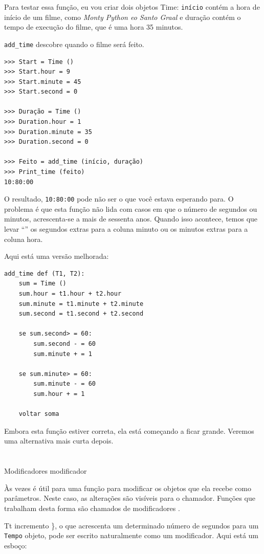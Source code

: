 \documentclass[10pt]{book}
\begin{document}
\begin{v erbatim}
Para testar essa função, eu vou criar dois objetos Time: {\tt início}
contém a hora de início de um filme, como {\em Monty Python eo
Santo Graal} e {duração \tt} contém o tempo de execução do filme,
que é uma hora 35 minutos.

\Verb "add_time" descobre quando o filme será feito.

\begin{verbatim}
>>> Start = Time ()
>>> Start.hour = 9
>>> Start.minute = 45
>>> Start.second = 0

>>> Duração = Time ()
>>> Duration.hour = 1
>>> Duration.minute = 35
>>> Duration.second = 0

>>> Feito = add_time (início, duração)
>>> Print_time (feito)
10:80:00
\end{verbatim}
%
O resultado, {\tt 10:80:00} pode não ser o que você estava esperando
para. O problema é que esta função não lida com casos em que o
número de segundos ou minutos, acrescenta-se a mais de sessenta anos. Quando isso
acontece, temos que levar ``'' os segundos extras para a coluna minuto
ou os minutos extras para a coluna hora.

Aqui está uma versão melhorada:

\begin{verbatim}
add_time def (T1, T2):
    sum = Time ()
    sum.hour = t1.hour + t2.hour
    sum.minute = t1.minute + t2.minute
    sum.second = t1.second + t2.second

    se sum.second> = 60:
        sum.second - = 60
        sum.minute + = 1

    se sum.minute> = 60:
        sum.minute - = 60
        sum.hour + = 1

    voltar soma
\end{verbatim}
%
Embora esta função estiver correta, ela está começando a ficar grande.
Veremos uma alternativa mais curta depois.


\section{} Modificadores
\label{incremento}
\index{} modificador

Às vezes é útil para uma função para modificar os objetos que ela recebe como
parâmetros. Neste caso, as alterações são visíveis para o chamador.
Funções que trabalham desta forma são chamados de modificadores {\bf}.

{Tt incremento \}, o que acrescenta um determinado número de segundos para um {\tt Tempo}
objeto, pode ser escrito naturalmente como um
modificador. Aqui está um esboço:

}
\end{v erbatim}
\end{document}

